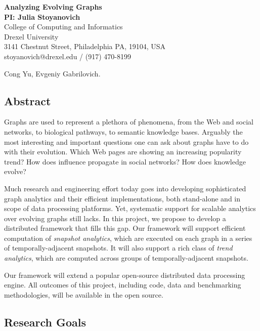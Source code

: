 \documentclass[11pt]{article}
\begin{document}
\begin{center}
{\Large\bf Analyzing Evolving Graphs}\\[7pt]

{\bf PI: Julia Stoyanovich} \\
College of Computing and Informatics \\
Drexel University \\
3141 Chestnut Street, Philadelphia PA, 19104, USA \\
stoyanovich@drexel.edu / (917) 470-8199 
\end{center}

  Cong Yu, Evgeniy Gabrilovich. 

\vspace{-0.4cm}
\subsection*{Abstract}
\vspace{-0.2cm}

Graphs are used to represent a plethora of phenomena, from the Web and
social networks, to biological pathways, to semantic knowledge bases.
Arguably the most interesting and important questions one can ask
about graphs have to do with their evolution. Which Web pages are
showing an increasing popularity trend?  How does influence propagate
in social networks?  How does knowledge evolve?

Much research and engineering effort today goes into developing
sophisticated graph analytics and their efficient implementations,
both stand-alone and in scope of data processing platforms.  Yet,
systematic support for scalable analytics over evolving graphs still
lacks.  In this project, we propose to develop a distributed framework
that fills this gap.  Our framework will support efficient computation
of {\em snapshot analytics}, which are executed on each graph in a
series of temporally-adjacent snapshots.  It will also support a rich
class of {\em trend analytics}, which are computed across groups of
temporally-adjacent snapshots.

Our framework will extend a popular open-source distributed data
processing engine.  All outcomes of this project, including code, data
and benchmarking methodologies, will be available in the open source.

\vspace{-0.2cm}
\subsection*{Research Goals}
\vspace{-0.2cm}
\end{document}
